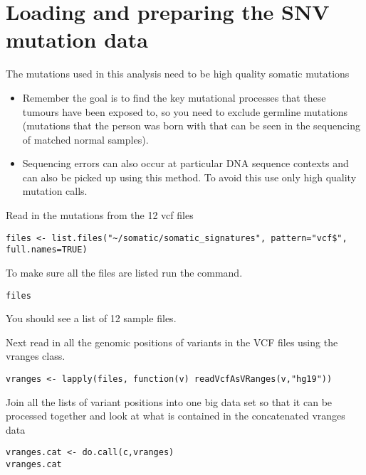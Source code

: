 
\section{Loading and preparing the SNV mutation data}

\begin{note}
The mutations used in this analysis need to be high quality somatic mutations
\begin{itemize}
\item Remember the goal is to find the key mutational processes that these tumours have been exposed to, so you need to exclude germline mutations (mutations that the person was born with that can be seen in the sequencing of matched normal samples). 
\item Sequencing errors can also occur at particular DNA sequence contexts and can also be picked up using this method. To avoid this use only high quality mutation calls.
\end{itemize}
\end{note}

\begin{steps}
Read in the mutations from the 12 vcf files
\begin{lstlisting}
files <- list.files("~/somatic/somatic_signatures", pattern="vcf$", full.names=TRUE)
\end{lstlisting}

To make sure all the files are listed run the command.
\begin{lstlisting}
files 
\end{lstlisting}

You should see a list of 12 sample files.

Next read in all the genomic positions of variants in the VCF files using the vranges class.
\begin{lstlisting}
vranges <- lapply(files, function(v) readVcfAsVRanges(v,"hg19"))
\end{lstlisting}

Join all the lists of variant positions into one big data set so that it can be
processed together and look at what is contained in the concatenated vranges data
\begin{lstlisting}
vranges.cat <- do.call(c,vranges)
vranges.cat
\end{lstlisting}
\end{steps}

